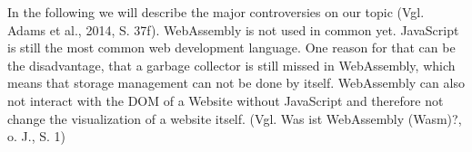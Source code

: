 In the following we will describe the major controversies on our topic (Vgl. Adams et al., 2014, S. 37f). WebAssembly is not used in common yet. JavaScript is still the most common web development language. One reason for that can be the disadvantage, that a garbage collector is still missed in WebAssembly, which means that storage management can not be done by itself. WebAssembly can also not interact with the DOM of a Website without JavaScript and therefore not change the visualization of a website itself. (Vgl. Was ist WebAssembly (Wasm)?, o. J., S. 1) 
